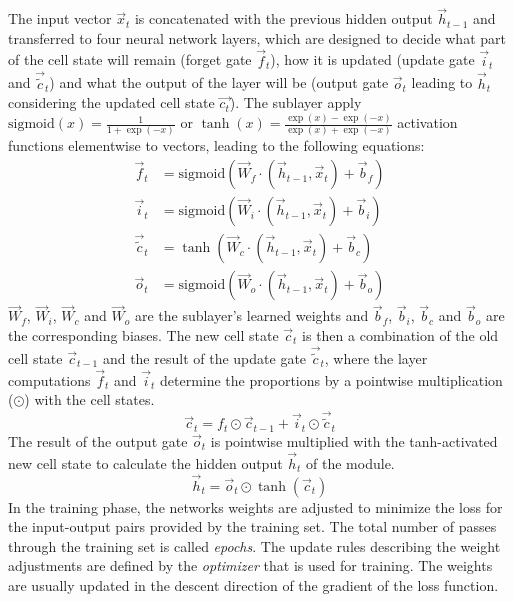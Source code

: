 The input vector $\vec{x}_t$ is concatenated with the previous hidden output $\vec{h}_{t-1}$ and transferred to four neural network layers, which are designed to decide what part of the cell state will remain (forget gate $\vec{f}_t$), how it is updated (update gate $\vec{i}_t$ and $\vec{\tilde{c}}_t$) and what the output of the layer will be (output gate $\vec{o}_t$ leading to $\vec{h}_t$ considering the updated cell state $\vec{c_t}$).
The sublayer apply $\text{sigmoid}(x) = \frac{1}{1+\exp({-x})}$ or $\tanh(x) = \frac{\exp({x}) - \exp({-x})}{\exp({x}) + \exp({-x})}$ activation functions elementwise to vectors, leading to the following equations:
\begin{align*}
\vec{f}_t & = \text{sigmoid}(\vec{W}_f \cdot (\vec{h}_{t-1}, \vec{x}_t) + \vec{b}_f) \\
\vec{i}_t & =  \text{sigmoid} (\vec{W}_i \cdot (\vec{h}_{t-1}, \vec{x}_t) + \vec{b}_i) \\
\vec{\tilde{c}}_t & = \tanh (\vec{W}_c \cdot (\vec{h}_{t-1}, \vec{x}_t) + \vec{b}_c) \\
\vec{o}_t & =  \text{sigmoid} (\vec{W}_o \cdot (\vec{h}_{t-1}, \vec{x}_t) + \vec{b}_o)
\end{align*}
$\vec{W}_f$, $\vec{W}_i$, $\vec{W}_c$ and $\vec{W}_o$ are the sublayer’s learned weights and $\vec{b}_f$, $\vec{b}_i$, $\vec{b}_c$ and $\vec{b}_o$ are the corresponding biases.
The new cell state $\vec{c}_t$ is then a combination of the old cell state $\vec{c}_{t-1}$ and the result of the update gate $\vec{\tilde{c}}_t$, where the layer computations $\vec{f}_t$ and $\vec{i}_t$ determine the proportions by a pointwise multiplication ($\odot$) with the cell states.
\begin{equation*}
	\vec{c}_t = f_t \odot \vec{c}_{t-1} + \vec{i}_t \odot \vec{\tilde{c}}_t
\end{equation*}
The result of the output gate $\vec{o}_t$ is pointwise multiplied with the tanh-activated new cell state to calculate the hidden output $\vec{h}_t$ of the module.
\begin{equation*}
	\vec{h}_t = \vec{o}_t \odot \tanh(\vec{c}_t )
\end{equation*}
In the training phase, the networks weights are adjusted to minimize the loss for the input-output pairs provided by the training set.
The total number of passes through the training set is called \textit{epochs}.
The update rules describing the weight adjustments are defined by the \textit{optimizer} that is used for training.
The weights are usually updated in the descent direction of the gradient of the loss function.

